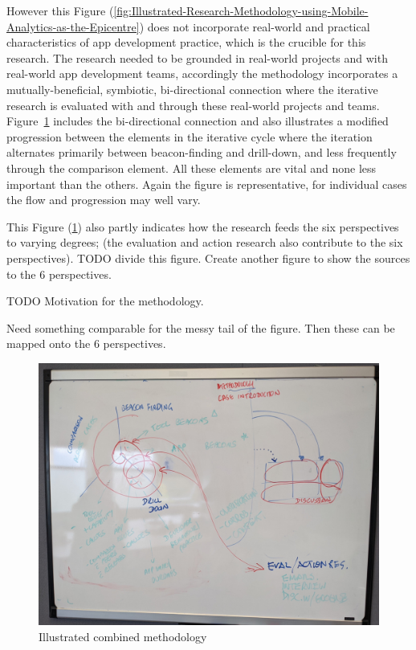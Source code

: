 However this Figure (\ref{fig:Illustrated-Research-Methodology-using-Mobile-Analytics-as-the-Epicentre}) does not incorporate real-world and practical characteristics of app development practice, which is the crucible for this research. The research needed to be grounded in real-world projects and with real-world app development teams, accordingly the methodology incorporates a mutually-beneficial, symbiotic, bi-directional connection where the iterative research is evaluated with and through these real-world projects and teams. Figure~\ref{fig:illustrated-combined-methodology} includes the bi-directional connection and also illustrates a modified progression between the elements in the iterative cycle where the iteration alternates primarily between beacon-finding and drill-down, and less frequently through the comparison element. All these elements are vital and none less important than the others. Again the figure is representative, for individual cases the flow and progression may well vary.

This Figure (\ref{fig:illustrated-combined-methodology}) also partly indicates how the research feeds the six perspectives to varying degrees; (the evaluation and action research also contribute to the six perspectives). TODO divide this figure. Create another figure to show the sources to the 6 perspectives. 

TODO Motivation for the methodology. 

Need something comparable for the messy tail of the figure. Then these can be mapped onto the 6 perspectives. 

\begin{figure}
    \centering
    \includegraphics[width=14cm]{images/my/illustrated-combined-methodology-v0-1.jpg}
    \caption{Illustrated combined methodology}
    \label{fig:illustrated-combined-methodology}
\end{figure}

